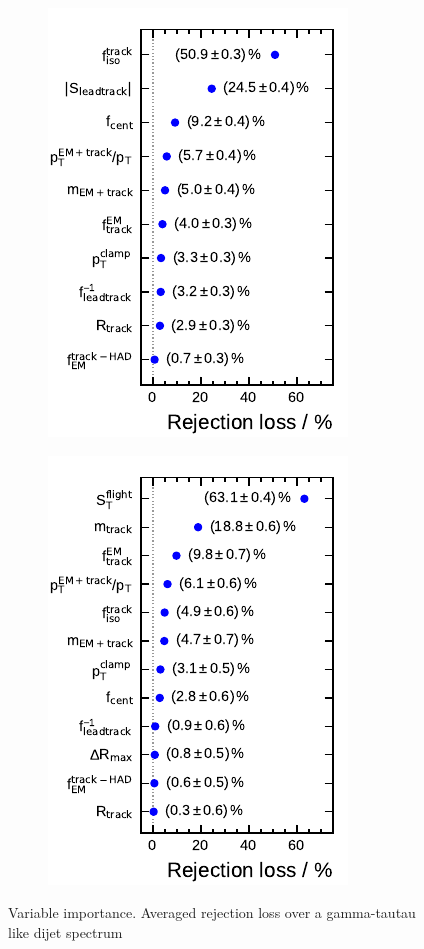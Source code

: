 \begin{figure}[ht]
  \centering
  \begin{subfigure}[t]{0.33\textwidth}
    \centering
    \includegraphics{./figures/bdt_perf/var_importance/1p_iter1.pdf}
  \end{subfigure}
  \begin{subfigure}[t]{0.33\textwidth}
    \centering
    \includegraphics{./figures/bdt_perf/var_importance/3p_iter1.pdf}
  \end{subfigure}
  \caption{Variable importance. Averaged rejection loss over a gamma-tautau like
    dijet spectrum}
  \label{fig:variable_importance}
\end{figure}

